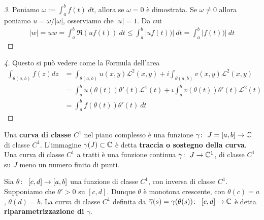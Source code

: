 \begin{proof}[3]
	Poniamo $\omega := \int_{a}^{b} f(t)\ dt$, allora se $\omega = 0$ è dimostrata. Se $\omega \neq 0$ allora poniamo $u = \overline{\omega}/|\omega|$, osserviamo che $|u|=1$. Da cui
	\begin{equation*}
	\begin{aligned}
	|w| = uw = \int_{a}^b \Re(uf(t))\ dt \le \int_{a}^b |uf(t))|\ dt = \int_{a}^b |f(t))|\ dt  
	\end{aligned}
	\end{equation*}
\end{proof}

\begin{proof}[4]
	Questo si può vedere come la Formula dell'area  
	\begin{equation*}
	\begin{aligned}
	\int_{\theta(a,b)} f(z) dz & = \int_{\theta(a,b)} u(x,y) \mathcal{L}^2(x,y)
	+ i\int_{\theta(a,b)} v(x,y) \mathcal{L}^2(x,y)\\
	& = \int_a^b u(\theta(t))\theta'(t) \mathcal{L}^1(t) 
	+ i\int^b_a v(\theta(t))\theta'(t) \mathcal{L}^2(t)\\
	& = \int_a^b f(\theta(t)) \theta'(t)\ dt		
	\end{aligned}
	\end{equation*}
\end{proof}

\begin{definition}
	\label{defn:curva-c1}
	Una \textbf{curva di classe $C^1$} nel piano complesso è una funzione $\gamma \colon\ J=\left[a,b\right] \rightarrow \mathbb{C}$ di classe $C^1$. L'immagine $\gamma(J) \subset \mathbb{C}$ è detta \textbf{traccia o sostegno della curva}. Una curva di classe $C^1$ a tratti è una funzione continua $\gamma \colon\ J \rightarrow \mathbb{C}^1$, di classe $C^1$ su $J$ meno un numero finito di punti.\\ 		
\end{definition}

\begin{definition}
	\label{defn:riparametrizzazione-curva-classe-c1}
	Sia $\theta \colon\ \left[c,d\right] \rightarrow \left[a,b\right]$ una funzione di classe $C^1$, con inversa di classe $C^1$. Supponiamo che $\theta' > 0$ su $\left[c, d\right]$. Dunque $\theta$ è monotona crescente, con $\theta(c) = a$, $\theta(d) = b$. La curva di classe $C^1$ definita da $\overline{\gamma}(s) = \gamma(\theta (s)) \colon\ \left[c,d\right] \rightarrow \mathbb{C}$ è detta \textbf{riparametrizzazione di $\gamma$}.
\end{definition}

